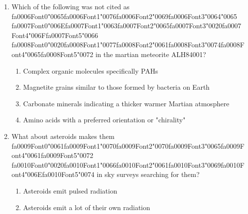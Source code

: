 \documentclass[12pt]{article}
\begin{document}
\begin{enumerate}[label=\arabic*.]
\begin{enumerate}[label=(\alph*)]
    \item ancient heavily cratered highlands
    \item dark lavas inside volcanic calderas
    \item dark lavas filling older impact basins
    \item the bright regions on the Moon
\end{enumerate}
\item Which of the following was not cited as {\csname fa0006Font0\endcsname\char"0065}{\csname fa0006Font1\endcsname\char"0076}{\csname fa0006Font2\endcsname\char"0069}{\csname fa0006Font3\endcsname\char"0064}{\char"0065} {\csname fa0007Font0\endcsname\char"006E}{\csname fa0007Font1\endcsname\char"0063}{\csname fa0007Font2\endcsname\char"0065}{\csname fa0007Font3\endcsname\char"0020}{\csname fa0007Font4\endcsname\char"006F}{\csname fa0007Font5\endcsname\char"0066} {\csname fa0008Font0\endcsname\char"0020}{\csname fa0008Font1\endcsname\char"0077}{\csname fa0008Font2\endcsname\char"0061}{\csname fa0008Font3\endcsname\char"0074}{\csname fa0008Font4\endcsname\char"0065}{\csname fa0008Font5\endcsname\char"0072} in the martian meteorite
ALH84001?
\begin{enumerate}[label=(\alph*)]
    \item Complex organic molecules specifically PAHs
    \item Magnetite grains similar to those formed by bacteria on Earth
    \item Carbonate minerals indicating a thicker warmer Martian atmosphere
    \item Amino acids with a preferred orientation or "chirality"
\end{enumerate}
\item What about asteroids makes them {\csname fa0009Font0\endcsname\char"0061}{\csname fa0009Font1\endcsname\char"0070}{\csname fa0009Font2\endcsname\char"0070}{\csname fa0009Font3\endcsname\char"0065}{\csname fa0009Font4\endcsname\char"0061}{\csname fa0009Font5\endcsname\char"0072} {\csname fa0010Font0\endcsname\char"0020}{\csname fa0010Font1\endcsname\char"0066}{\csname fa0010Font2\endcsname\char"0061}{\csname fa0010Font3\endcsname\char"0069}{\csname fa0010Font4\endcsname\char"006E}{\csname fa0010Font5\endcsname\char"0074} in sky surveys searching for them?
\begin{enumerate}[label=(\alph*)]
    \item Asteroids emit pulsed radiation
    \item Asteroids emit a lot of their own radiation

\end{enumerate}
\end{enumerate}
\end{document}
